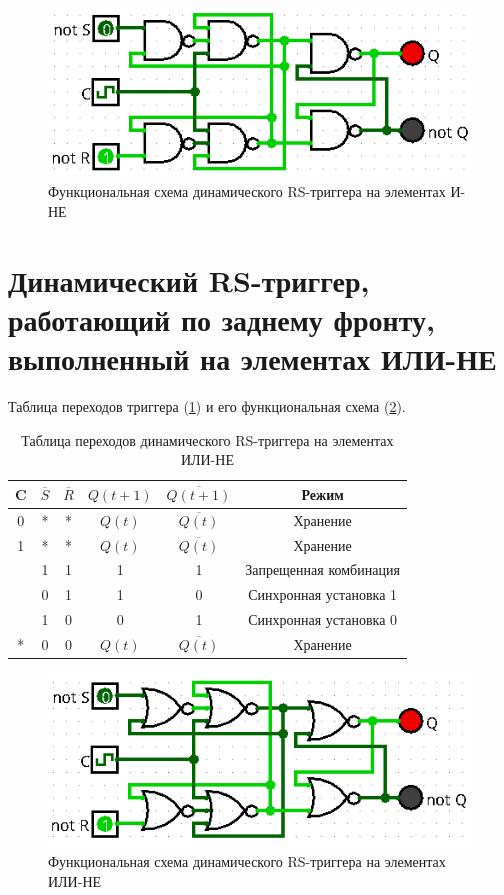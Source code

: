 \documentclass[14pt, a4paper]{extreport}
\newcommand\clocktb{%
	\begin{tikzpicture}[scale=0.25pt]
		\draw (0,1) -- (1,1) -- (1,0) -- (2,0);
	\end{tikzpicture}%
}
\begin{document}
\begin{figure}[H]
	\caption{Функциональная схема динамического RS-триггера на элементах И-НЕ}
	\label{fig:dynamic-rs-nand}
	\includegraphics[width=\textwidth]{dynamic-rs-nand}
\end{figure}

\section{Динамический RS-триггер, работающий по заднему фронту, выполненный на элементах ИЛИ-НЕ}
Таблица переходов триггера (\cref{tab:dynamic-rs-nor}) и его функциональная схема (\cref{fig:dynamic-rs-nor}).

\begin{table}[H]
	\caption{Таблица переходов динамического RS-триггера на элементах ИЛИ-НЕ}
	\label{tab:dynamic-rs-nor}
	\begin{tabular}{|c|c|c|c|c|c|}
		\hline
		C & $\overline{S}$ & $\overline{R}$ & $Q(t + 1)$ & $\overline{Q(t + 1)}$ & Режим \\
		\hline
		0 & * & * & $Q(t)$ & $\overline{Q(t)}$ & Хранение \\
		\hline
		1 & * & * & $Q(t)$ & $\overline{Q(t)}$ & Хранение \\
		\hline
		\clocktb & 1 & 1 & 1 & 1 & Запрещенная комбинация \\
		\hline
		\clocktb & 0 & 1 & 1 & 0 & Синхронная установка 1 \\
		\hline
		\clocktb & 1 & 0 & 0 & 1 & Синхронная установка 0 \\
		\hline
		* & 0 & 0 & $Q(t)$ & $\overline{Q(t)}$ & Хранение \\
		\hline
	\end{tabular}
\end{table}

\begin{figure}[H]
	\caption{Функциональная схема динамического RS-триггера на элементах ИЛИ-НЕ}
	\label{fig:dynamic-rs-nor}
	\includegraphics[width=\textwidth]{dynamic-rs-nor}
\end{figure}
\end{document}
